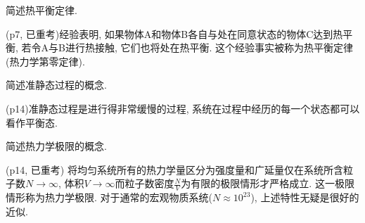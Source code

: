 \begin{questions}
\begin{solution}
  \end{solution}
  \question 简述热平衡定律.
  \begin{solution}
    (p7, 已重考)经验表明, 如果物体A和物体B各自与处在同意状态的物体C达到热平衡, 若令A与B进行热接触, 它们也将处在热平衡. 这个经验事实被称为热平衡定律(热力学第零定律).
  \end{solution}
  \question 简述准静态过程的概念.
  \begin{solution}
    (p14)准静态过程是进行得非常缓慢的过程, 系统在过程中经历的每一个状态都可以看作平衡态.
  \end{solution}
  \question 简述热力学极限的概念.
  \begin{solution}
    (p14, 已重考) 将均匀系统所有的热力学量区分为强度量和广延量仅在系统所含粒子数$N\to\infty$, 体积$V\to\infty$而粒子数密度$\frac{N}{V}$为有限的极限情形才严格成立. 这一极限情形称为热力学极限. 对于通常的宏观物质系统($N\approx 10^{23}$), 上述特性无疑是很好的近似.
  \end{solution}
\end{questions}
